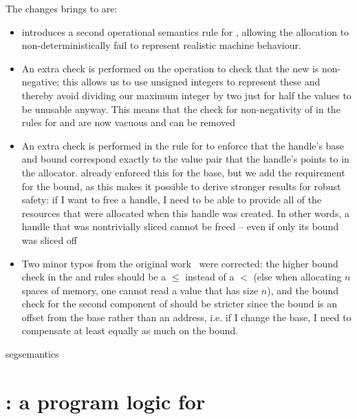 \documentclass[acmsmall,screen]{acmart}\settopmatter{}
\begin{document}
The changes \irismswasm brings to \mswasm are:
\begin{itemize}
\item \irismswasm introduces a second operational semantics rule for \xxWsegalloc, allowing the allocation to non-deterministically fail to represent realistic machine behaviour. 
\item An extra check is performed on the \xxWhandleadd operation to check that the new \xxWoffset is non-negative; this allows us to use unsigned integers to represent these and thereby avoid dividing our maximum integer by two just for half the values to be unusable anyway. This means that the check for non-negativity of \xxWoffset in the rules for \xxWsegload and \xxWsegstore are now vacuous and can be removed
\item An extra check is performed in the rule for \xxWsegfree to enforce that the handle's base and bound correspond exactly to the value pair that the handle's \xxWid points to in the allocator. \mswasm already enforced this for the base, but we add the requirement for the bound, as this makes it possible to derive stronger results for robust safety: if I want to free a handle, I need to be able to provide all of the resources that were allocated when this handle was created. In other words, a handle that was nontrivially sliced cannot be freed -- even if only its bound was sliced off
\item Two minor typos from the original work~\cite{mswasm} were corrected: the higher bound check in the \xxWsegload and \xxWsegstore rules should be a \( \leq \) instead of a \( < \) (else when allocating \( n \) spaces of memory, one cannot read a value that has size \( n \)), and the bound check for the second component of \xxWslice should be stricter since the bound is an offset from the base rather than an address, i.e. if I change the base, I need to compensate at least equally as much on the bound.
\end{itemize}


{segsemantics}







\section{\irismswasm: a program logic for \mswasm}
\end{document}
